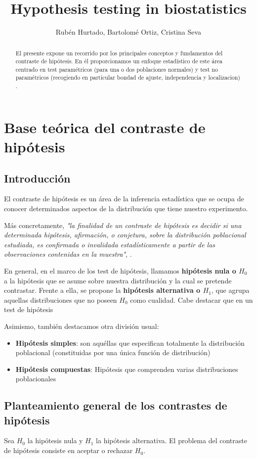 \documentclass[a4paper,12pt]{article}
\title{Hypothesis testing in biostatistics}
\author{Rubén Hurtado, Bartolomé Ortiz, Cristina Seva }
\begin{document}
\maketitle

\begin{abstract}
El presente expone un recorrido por los principales conceptos y fundamentos del contraste de hipótesis. En él proporcionamos un enfoque estadístico de este área centrado en test paramétricos (para una o dos poblaciones normales) y test no paramétricos (recogiendo en particular bondad de ajuste, independencia y localizacion) . 
\end{abstract}


\section{Base teórica del contraste de hipótesis}
\subsection{Introducción}
El contraste de hipótesis es un área de la inferencia estadística que se ocupa de conocer determinados aspectos de la distribución que tiene nuestro experimento.

Más concretamente, \textit{"la finalidad de un contraste de hipótesis es decidir si una determinada hipótesis, afirmación, o conjetura, sobre la distribución poblacional estudiada, es confirmada o invalidada estadísticamente a partir de las observaciones contenidas en la muestra"}, \cite{velez1993principios}.

En general, en el marco de los test de hipótesis, llamamos \textbf{hipótesis nula o $H_0$} a la hipótesis que se asume sobre nuestra distribución y la cual se pretende contrastar.
Frente a ella, se propone la \textbf{hipótesis alternativa o $H_1$}, que agrupa aquellas distribuciones que no poseen $H_0$ como cualidad.
Cabe destacar que en un test de hipótesis 

Asimismo, también destacamos otra división usual:
\begin{itemize}
	\item \textbf{Hipótesis simples}: son aquéllas que especifican totalmente la distribución poblacional (constituidas por una única función de distribución)
	\item \textbf{Hipótesis compuestas}: Hipótesis  que comprenden varias distribuciones poblacionales 
\end{itemize}

\subsection{Planteamiento general de los contrastes de hipótesis}
Sea $H_0$ la hipótesis nula y $H_1$ la hipótesis alternativa. El problema del contraste de hipótesis consiste en aceptar o rechazar $H_0$.
\end{document}
